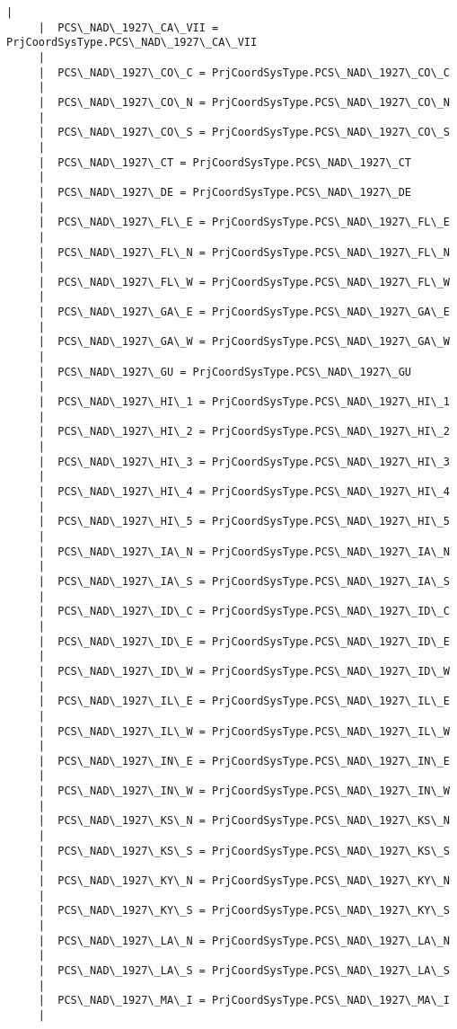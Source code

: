 \documentclass[11pt]{article}
\begin{document}
\begin{Verbatim}[commandchars=\\\{\}]
     |  
     |  PCS\_NAD\_1927\_CA\_VII = PrjCoordSysType.PCS\_NAD\_1927\_CA\_VII
     |  
     |  PCS\_NAD\_1927\_CO\_C = PrjCoordSysType.PCS\_NAD\_1927\_CO\_C
     |  
     |  PCS\_NAD\_1927\_CO\_N = PrjCoordSysType.PCS\_NAD\_1927\_CO\_N
     |  
     |  PCS\_NAD\_1927\_CO\_S = PrjCoordSysType.PCS\_NAD\_1927\_CO\_S
     |  
     |  PCS\_NAD\_1927\_CT = PrjCoordSysType.PCS\_NAD\_1927\_CT
     |  
     |  PCS\_NAD\_1927\_DE = PrjCoordSysType.PCS\_NAD\_1927\_DE
     |  
     |  PCS\_NAD\_1927\_FL\_E = PrjCoordSysType.PCS\_NAD\_1927\_FL\_E
     |  
     |  PCS\_NAD\_1927\_FL\_N = PrjCoordSysType.PCS\_NAD\_1927\_FL\_N
     |  
     |  PCS\_NAD\_1927\_FL\_W = PrjCoordSysType.PCS\_NAD\_1927\_FL\_W
     |  
     |  PCS\_NAD\_1927\_GA\_E = PrjCoordSysType.PCS\_NAD\_1927\_GA\_E
     |  
     |  PCS\_NAD\_1927\_GA\_W = PrjCoordSysType.PCS\_NAD\_1927\_GA\_W
     |  
     |  PCS\_NAD\_1927\_GU = PrjCoordSysType.PCS\_NAD\_1927\_GU
     |  
     |  PCS\_NAD\_1927\_HI\_1 = PrjCoordSysType.PCS\_NAD\_1927\_HI\_1
     |  
     |  PCS\_NAD\_1927\_HI\_2 = PrjCoordSysType.PCS\_NAD\_1927\_HI\_2
     |  
     |  PCS\_NAD\_1927\_HI\_3 = PrjCoordSysType.PCS\_NAD\_1927\_HI\_3
     |  
     |  PCS\_NAD\_1927\_HI\_4 = PrjCoordSysType.PCS\_NAD\_1927\_HI\_4
     |  
     |  PCS\_NAD\_1927\_HI\_5 = PrjCoordSysType.PCS\_NAD\_1927\_HI\_5
     |  
     |  PCS\_NAD\_1927\_IA\_N = PrjCoordSysType.PCS\_NAD\_1927\_IA\_N
     |  
     |  PCS\_NAD\_1927\_IA\_S = PrjCoordSysType.PCS\_NAD\_1927\_IA\_S
     |  
     |  PCS\_NAD\_1927\_ID\_C = PrjCoordSysType.PCS\_NAD\_1927\_ID\_C
     |  
     |  PCS\_NAD\_1927\_ID\_E = PrjCoordSysType.PCS\_NAD\_1927\_ID\_E
     |  
     |  PCS\_NAD\_1927\_ID\_W = PrjCoordSysType.PCS\_NAD\_1927\_ID\_W
     |  
     |  PCS\_NAD\_1927\_IL\_E = PrjCoordSysType.PCS\_NAD\_1927\_IL\_E
     |  
     |  PCS\_NAD\_1927\_IL\_W = PrjCoordSysType.PCS\_NAD\_1927\_IL\_W
     |  
     |  PCS\_NAD\_1927\_IN\_E = PrjCoordSysType.PCS\_NAD\_1927\_IN\_E
     |  
     |  PCS\_NAD\_1927\_IN\_W = PrjCoordSysType.PCS\_NAD\_1927\_IN\_W
     |  
     |  PCS\_NAD\_1927\_KS\_N = PrjCoordSysType.PCS\_NAD\_1927\_KS\_N
     |  
     |  PCS\_NAD\_1927\_KS\_S = PrjCoordSysType.PCS\_NAD\_1927\_KS\_S
     |  
     |  PCS\_NAD\_1927\_KY\_N = PrjCoordSysType.PCS\_NAD\_1927\_KY\_N
     |  
     |  PCS\_NAD\_1927\_KY\_S = PrjCoordSysType.PCS\_NAD\_1927\_KY\_S
     |  
     |  PCS\_NAD\_1927\_LA\_N = PrjCoordSysType.PCS\_NAD\_1927\_LA\_N
     |  
     |  PCS\_NAD\_1927\_LA\_S = PrjCoordSysType.PCS\_NAD\_1927\_LA\_S
     |  
     |  PCS\_NAD\_1927\_MA\_I = PrjCoordSysType.PCS\_NAD\_1927\_MA\_I
     |  

\end{Verbatim}
\end{document}
